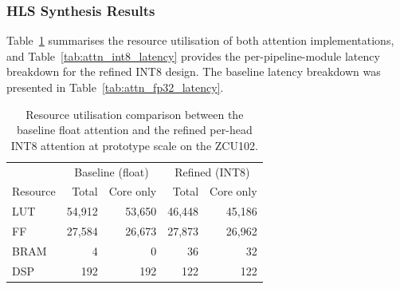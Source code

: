 \subsubsection{HLS Synthesis Results}
\label{subsec:attn_csyn}

Table~\ref{tab:attn_compare_resources} summarises the resource
utilisation of both attention implementations, and
Table~\ref{tab:attn_int8_latency} provides the per-pipeline-module
latency breakdown for the refined INT8 design. The baseline latency
breakdown was presented in Table~\ref{tab:attn_fp32_latency}.

\begin{table}[H]
  \centering
  \begin{tabular}{lrrrr}
    \toprule
    & \multicolumn{2}{c}{Baseline (float)} & \multicolumn{2}{c}{Refined (INT8)} \\
    Resource & Total & Core only & Total & Core only \\
    \midrule
    LUT  & 54{,}912 & 53{,}650 & 46{,}448 & 45{,}186 \\
    FF   & 27{,}584 & 26{,}673 & 27{,}873 & 26{,}962 \\
    BRAM & 4        & 0        & 36       & 32       \\
    DSP  & 192      & 192      & 122      & 122      \\
    \bottomrule
  \end{tabular}
  \caption{Resource utilisation comparison between the baseline float
           attention and the refined per-head INT8 attention at prototype
           scale on the ZCU102.}
  \label{tab:attn_compare_resources}
\end{table}

